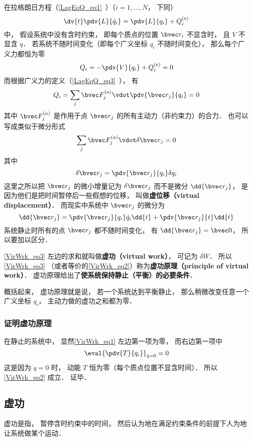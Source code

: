 
\begin{issues}
\issueTODO
\end{issues}


在拉格朗日方程（\autoref{LagEqQ_eq1}~）（$i=1,\dots,N$， 下同）
\begin{equation}\label{VirWrk_eq1}
\dv{t} \pdv{L}{\dot q_i} = \pdv{L}{q_i} + Q_i^{(e)}
\end{equation}
中， 假设系统中没有含时约束， 即每个质点的位置 $\bvec r_i$ 不显含时， 且 $V$ 不显含 $\dot q$． 若系统不随时间变化（即每个广义坐标 $q_i$ 不随时间变化）， 那么每个广义力都恒为零
\begin{equation}\label{VirWrk_eq2}
Q_i = -\pdv{V}{q_i} + Q_i^{(e)} = 0
\end{equation}
而根据广义力的定义（\autoref{LagEqQ_eq3}~）， 有
\begin{equation}
Q_i = \sum_j \bvec F_j^{(a)} \vdot \pdv{\bvec r_j}{q_i} = 0
\end{equation}
其中 $\bvec F_j^{(a)}$ 是作用于点 $\bvec r_j$ 的所有主动力（非约束力）的合力． 也可以写成类似于微分形式
\begin{equation}\label{VirWrk_eq3}
\sum_j \bvec F_j^{(a)} \vdot \delta \bvec r_j = 0
\end{equation}
其中
\begin{equation}
\delta \bvec r_j = \pdv{\bvec r_j}{q_i}\delta{q_i}
\end{equation}
这里之所以把 $\bvec r_j$ 的微小增量记为 $\delta \bvec r_j$ 而不是微分 $\dd{\bvec r_j}$， 是因为他们是把时间暂停后一些假想的位移， 叫做\textbf{虚位移（virtual displacement）}． 而现实中系统中 $\bvec r_j$ 的微分为
\begin{equation}
\dd{\bvec r_j} = \pdv{\bvec r_j}{q_i}\dot{q}_i\dd{t} + \pdv{\bvec r_j}{t}\dd{t}
\end{equation}
系统静止时所有的点 $\bvec r_j$ 都不随时间变化， 有 $\dd{\bvec r_j} = \bvec 0$， 所以要加以区分．

\autoref{VirWrk_eq3} 左边的求和就叫做\textbf{虚功（virtual work）}， 可记为 $\delta W$． 所以\autoref{VirWrk_eq3} （或者等价的\autoref{VirWrk_eq2}）称为\textbf{虚功原理（principle of virtual work）}． 虚功原理给出了\textbf{使系统保持静止（平衡）的必要条件}．

概括起来， 虚功原理就是说， 若一个系统达到平衡静止， 那么稍微改变任意一个广义坐标 $q_i$， 主动力做的虚功之和都为零．

\subsubsection{证明虚功原理}
在静止的系统中， 显然\autoref{VirWrk_eq1} 左边第一项为零， 而右边第一项中
\begin{equation}
\eval{\pdv{T}{q_i}}_{\dot q = 0} = 0
\end{equation}
这是因为 $\dot q = 0$ 时， 动能 $T$ 恒为零（每个质点位置不显含时间）． 所以\autoref{VirWrk_eq2} 成立． 证毕．


\subsection{虚功}
虚功是指， 暂停含时约束中的时间， 然后认为地在满足约束条件的前提下人为地让系统做某个运动．
